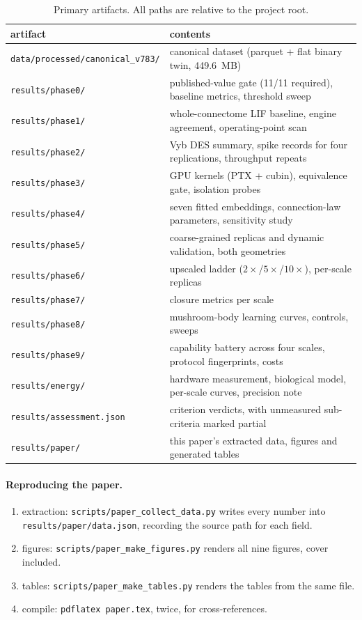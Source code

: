 \documentclass[11pt,a4paper]{article}
\newcommand{\code}[1]{\texttt{\footnotesize #1}}
\begin{document}
\begin{table}[h]
\centering
\caption{Primary artifacts. All paths are relative to the project root.}
\begin{tabular}{p{4.6cm} p{10.4cm}}
\toprule
artifact & contents \\
\midrule
\code{data/processed/canonical\_v783/} & canonical dataset (parquet + flat binary twin, 449.6~MB) \\
\code{results/phase0/} & published-value gate (11/11 required), baseline metrics, threshold sweep \\
\code{results/phase1/} & whole-connectome LIF baseline, engine agreement, operating-point scan \\
\code{results/phase2/} & Vyb DES summary, spike records for four replications, throughput repeats \\
\code{results/phase3/} & GPU kernels (PTX + cubin), equivalence gate, isolation probes \\
\code{results/phase4/} & seven fitted embeddings, connection-law parameters, sensitivity study \\
\code{results/phase5/} & coarse-grained replicas and dynamic validation, both geometries \\
\code{results/phase6/} & upscaled ladder ($2\times$/$5\times$/$10\times$), per-scale replicas \\
\code{results/phase7/} & closure metrics per scale \\
\code{results/phase8/} & mushroom-body learning curves, controls, sweeps \\
\code{results/phase9/} & capability battery across four scales, protocol fingerprints, costs \\
\code{results/energy/} & hardware measurement, biological model, per-scale curves, precision note \\
\code{results/assessment.json} & criterion verdicts, with unmeasured sub-criteria marked partial \\
\code{results/paper/} & this paper's extracted data, figures and generated tables \\
\bottomrule
\end{tabular}
\end{table}

\paragraph{Reproducing the paper.}
{\sloppy
\begin{enumerate}
\item extraction: \code{scripts/paper\_collect\_data.py} writes every number into
\code{results/paper/data.json}, recording the source path for each field.
\item figures: \code{scripts/paper\_make\_figures.py} renders all nine figures, cover included.
\item tables: \code{scripts/paper\_make\_tables.py} renders the tables from the same file.
\item compile: \code{pdflatex paper.tex}, twice, for cross-references.
\end{enumerate}
}
\end{document}
